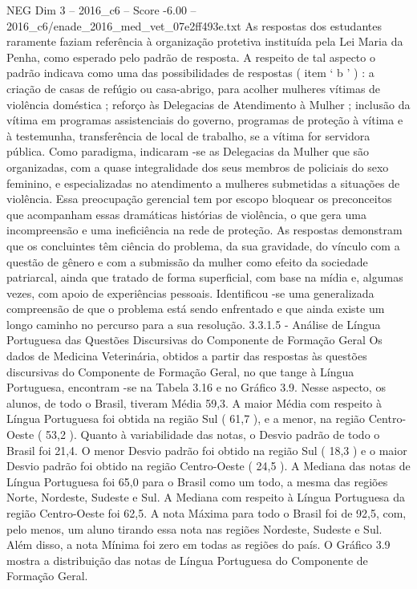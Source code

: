 \begin{textsample}{NEG Dim 3 – 2016\_c6 – Score -6.00 – 2016\_c6/enade\_2016\_med\_vet\_07e2ff493e.txt}
As respostas dos estudantes raramente faziam referência à organização protetiva instituída pela Lei Maria da Penha, como esperado pelo padrão de resposta.
A respeito de tal aspecto o padrão indicava como uma das possibilidades de respostas ( item ‘ b ’ ) : a criação de casas de refúgio ou casa-abrigo, para acolher mulheres vítimas de violência doméstica ; reforço às Delegacias de Atendimento à Mulher ; inclusão da vítima em programas assistenciais do governo, programas de proteção à vítima e à testemunha, transferência de local de trabalho, se a vítima for servidora pública.
Como paradigma, indicaram -se as Delegacias da Mulher que são organizadas, com a quase integralidade dos seus membros de policiais do sexo feminino, e especializadas no atendimento a mulheres submetidas a situações de violência.
Essa preocupação gerencial tem por escopo bloquear os preconceitos que acompanham essas dramáticas histórias de violência, o que gera uma incompreensão e uma ineficiência na rede de proteção.
As respostas demonstram que os concluintes têm ciência do problema, da sua gravidade, do vínculo com a questão de gênero e com a submissão da mulher como efeito da sociedade patriarcal, ainda que tratado de forma superficial, com base na mídia e, algumas vezes, com apoio de experiências pessoais.
Identificou -se uma generalizada compreensão de que o problema está sendo enfrentado e que ainda existe um longo caminho no percurso para a sua resolução. 3.3.1.5 - Análise de Língua Portuguesa das Questões Discursivas do Componente de Formação Geral Os dados de Medicina Veterinária, obtidos a partir das respostas às questões discursivas do Componente de Formação Geral, no que tange à Língua Portuguesa, encontram -se na Tabela 3.16 e no Gráfico 3.9.
Nesse aspecto, os alunos, de todo o Brasil, tiveram Média 59,3.
A maior Média com respeito à Língua Portuguesa foi obtida na região Sul ( 61,7 ), e a menor, na região Centro-Oeste ( 53,2 ).
Quanto à variabilidade das notas, o Desvio padrão de todo o Brasil foi 21,4.
O menor Desvio padrão foi obtido na região Sul ( 18,3 ) e o maior Desvio padrão foi obtido na região Centro-Oeste ( 24,5 ).
A Mediana das notas de Língua Portuguesa foi 65,0 para o Brasil como um todo, a mesma das regiões Norte, Nordeste, Sudeste e Sul.
A Mediana com respeito à Língua Portuguesa da região Centro-Oeste foi 62,5.
A nota Máxima para todo o Brasil foi de 92,5, com, pelo menos, um aluno tirando essa nota nas regiões Nordeste, Sudeste e Sul.
Além disso, a nota Mínima foi zero em todas as regiões do país.
O Gráfico 3.9 mostra a distribuição das notas de Língua Portuguesa do Componente de Formação Geral.

\end{textsample}
